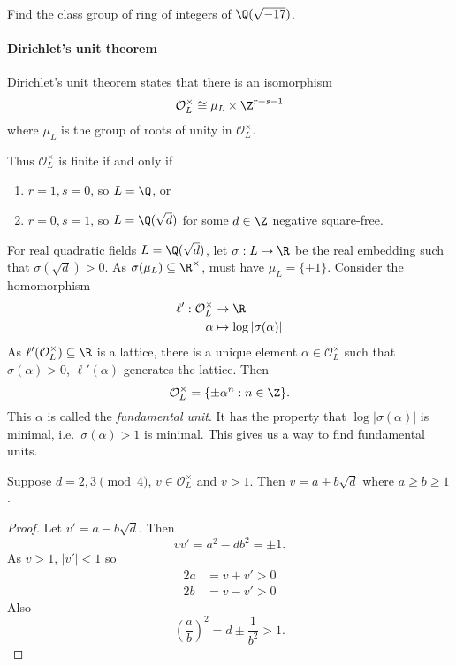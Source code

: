 \documentclass[a4paper]{article}
\renewcommand*{\O}{\mathcal{O}}
\begin{document}
\begin{ex}
  Find the class group of ring of integers of \(\Q(\sqrt{-17})\).
\end{ex}

\paragraph{Dirichlet's unit theorem}

Dirichlet's unit theorem states that there is an isomorphism
\[
  \O_L^\times \cong \mu_L \times \Z^{r + s - 1}
\]
where \(\mu_L\) is the group of roots of unity in \(\O_L^\times\).

Thus \(\O_L^\times\) is finite if and only if
\begin{enumerate}
\item \(r = 1, s = 0\), so \(L = \Q\), or
\item \(r = 0, s = 1\), so \(L = \Q(\sqrt d)\) for some \(d \in \Z\) negative square-free.
\end{enumerate}

For real quadratic fields \(L = \Q(\sqrt d)\), let \(\sigma: L \to \R\) be the real embedding such that \(\sigma(\sqrt d) > 0\). As \(\sigma(\mu_L) \subseteq \R^\times\), must have \(\mu_L =  \{\pm 1\}\). Consider the homomorphism
\begin{align*}
  \ell': \O_L^\times &\to \R \\
  \alpha &\mapsto \log |\sigma(\alpha)|
\end{align*}
As \(\ell'(\O_L^\times) \subseteq \R\) is a lattice, there is a unique element \(\alpha \in \O_L^\times\) such that \(\sigma(\alpha) > 0\), \(\ell'(\alpha)\) generates the lattice. Then
\[
  \O_L^\times = \{\pm \alpha^n: n \in \Z\}.
\]
This \(\alpha\) is called the \emph{fundamental unit}. It has the property that \(\log |\sigma(\alpha)|\) is minimal, i.e.\ \(\sigma(\alpha) > 1\) is minimal. This gives us a way to find fundamental units.

\begin{lemma}
  Suppose \(d = 2, 3 \pmod 4\), \(v \in \O_L^\times\) and \(v > 1\). Then \(v = a + b \sqrt d\) where \(a \geq b \geq 1\).
\end{lemma}

\begin{proof}
  Let \(v' = a - b \sqrt d\). Then
  \[
    vv' = a^2 - db^2 = \pm 1.
  \]
  As \(v > 1\), \(|v'| < 1\) so
  \begin{align*}
    2a &= v + v' > 0 \\
    2b &= v - v' > 0
  \end{align*}
  Also
  \[
    \left( \frac{a}{b} \right)^2 = d \pm \frac{1}{b^2} > 1.
  \]
\end{proof}
\end{document}
